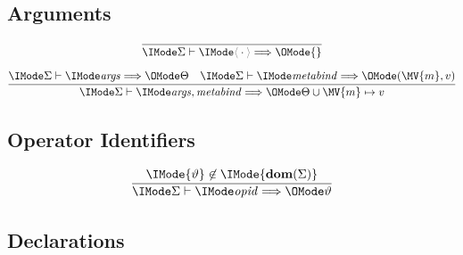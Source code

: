 \documentclass{article}
\begin{document}
\subsection*{Arguments\hfill \framebox{$\Elab{\Sigma}{\SortArgs}{\Theta}$}}

\begin{gather}
  \infer{
    \Elab{\Sigma}{\EmptyCtx}{\{\}}
  }{
  }\\[6pt]
  \infer{
    \Elab{\Sigma}{\ExtendCtx{\SortArgs}{\SortMetaBind}}{
      \Theta\cup{\MV{m} \mapsto v}
    }
  }{
    \Elab{\Sigma}{\SortArgs}{\Theta} &
    \Elab{\Sigma}{\SortMetaBind}{(\MV{m}, v)}
  }
\end{gather}

\subsection*{Operator Identifiers\hfill \framebox{$\Elab{\Sigma}{\SortOpId}{\vartheta}$}}

\begin{gather}
  \infer{
    \Elab{\Sigma}{\SortOpId}{\vartheta}
  }{
    \IMode{\vartheta}\not\in\IMode{\mathbf{dom}(\Sigma)}
  }
\end{gather}

\subsection*{Declarations\hfill {}}
\end{document}
